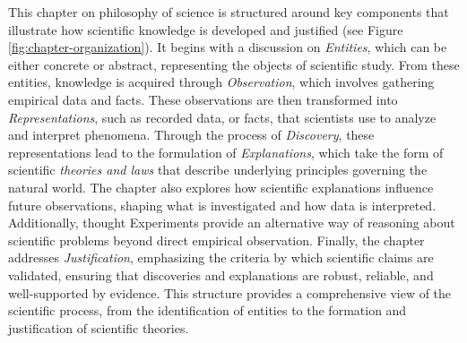 





This chapter on philosophy of science is structured around key components that illustrate how scientific knowledge is developed and justified (see Figure \ref{fig:chapter-organization}). It begins with a discussion on \emph{Entities}, which can be either concrete or abstract, representing the objects of scientific study. From these entities, knowledge is acquired through \emph{Observation}, which involves gathering empirical data and facts. These observations are then transformed into \emph{Representations}, such as recorded data, or facts, that scientists use to analyze and interpret phenomena. Through the process of \emph{Discovery}, these representations lead to the formulation of \emph{Explanations}, which take the form of scientific \emph{theories and laws} that describe underlying principles governing the natural world. The chapter also explores how scientific explanations influence future observations, shaping what is investigated and how data is interpreted. Additionally, thought Experiments provide an alternative way of reasoning about scientific problems beyond direct empirical observation. Finally, the chapter addresses \emph{Justification}, emphasizing the criteria by which scientific claims are validated, ensuring that discoveries and explanations are robust, reliable, and well-supported by evidence. This structure provides a comprehensive view of the scientific process, from the identification of entities to the formation and justification of scientific theories.

